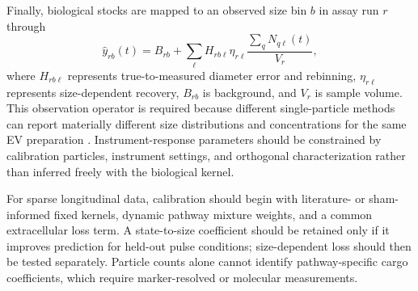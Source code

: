 Finally, biological stocks are mapped to an observed size bin $b$ in assay run $r$ through
\begin{equation*}
\widehat{y}_{rb}(t)=B_{rb}
+\sum_{\ell}H_{rb\ell}\eta_{r\ell}
\frac{\sum_qN_{q\ell}(t)}{V_r},
\end{equation*}
where $H_{rb\ell}$ represents true-to-measured diameter error and rebinning, $\eta_{r\ell}$ represents size-dependent recovery, $B_{rb}$ is background, and $V_r$ is sample volume. This observation operator is required because different single-particle methods can report materially different size distributions and concentrations for the same EV preparation \cite{vanDerPol2014particle,welsh2024minimal}. Instrument-response parameters should be constrained by calibration particles, instrument settings, and orthogonal characterization rather than inferred freely with the biological kernel.

For sparse longitudinal data, calibration should begin with literature- or sham-informed fixed kernels, dynamic pathway mixture weights, and a common extracellular loss term. A state-to-size coefficient should be retained only if it improves prediction for held-out pulse conditions; size-dependent loss should then be tested separately. Particle counts alone cannot identify pathway-specific cargo coefficients, which require marker-resolved or molecular measurements.
